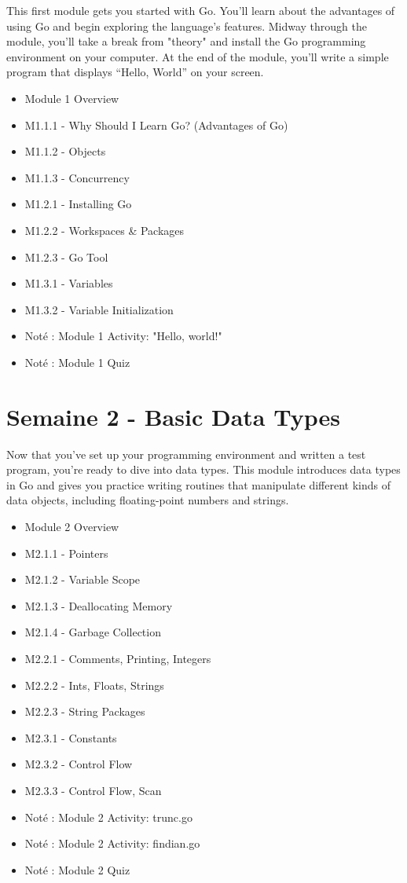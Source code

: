 This first module gets you started with Go. You'll learn about the advantages of using Go and begin exploring the language's features. Midway through the module, you’ll take a break from "theory" and install the Go programming environment on your computer. At the end of the module, you'll write a simple program that displays “Hello, World” on your screen.

\begin{itemize}[label={$\bullet$}]
   \item Module 1 Overview
   \item M1.1.1 - Why Should I Learn Go? (Advantages of Go)
   \item M1.1.2 - Objects
   \item M1.1.3 - Concurrency
   \item M1.2.1 - Installing Go
   \item M1.2.2 - Workspaces \& Packages
   \item M1.2.3 - Go Tool
   \item M1.3.1 - Variables
   \item M1.3.2 - Variable Initialization
   \item Noté : Module 1 Activity: "Hello, world!"
   \item Noté : Module 1 Quiz
\end{itemize}

\newpage 

\section*{Semaine 2 - Basic Data Types}

Now that you’ve set up your programming environment and written a test program, you’re ready to dive into data types. This module introduces data types in Go and gives you practice writing routines that manipulate different kinds of data objects, including floating-point numbers and strings.

\begin{itemize}[label={$\bullet$}]
   \item Module 2 Overview
   \item M2.1.1 - Pointers
   \item M2.1.2 - Variable Scope
   \item M2.1.3 - Deallocating Memory
   \item M2.1.4 - Garbage Collection
   \item M2.2.1 - Comments, Printing, Integers
   \item M2.2.2 - Ints, Floats, Strings
   \item M2.2.3 - String Packages
   \item M2.3.1 - Constants
   \item M2.3.2 - Control Flow
   \item M2.3.3 - Control Flow, Scan
   \item Noté : Module 2 Activity: trunc.go
   \item Noté : Module 2 Activity: findian.go
   \item Noté : Module 2 Quiz
\end{itemize}


